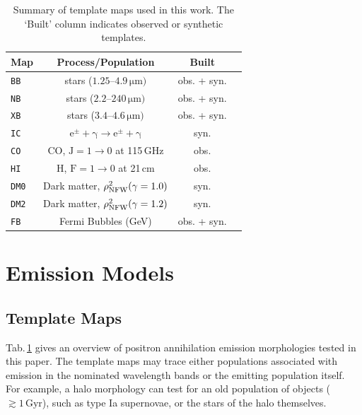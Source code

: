 \documentclass[doublespace,draft,nopageskip]{VTthesis} %
\begin{document}
	
	\begin{table}
		\centering
		\caption{Summary of template maps used in this work. The `Built' column indicates observed or synthetic templates.}
		\begin{tabular}{lccc}
			\hline
			\hline
			Map & Process/Population                                  & Built               \\
			\hline
			\texttt{BB}  & stars ($1.25$--$4.9\,\mathrm{\mu m})$     & obs. + syn.        \\
			\texttt{NB}  & stars  ($2.2$--$240\,\mathrm{\mu m})$     & obs. + syn. \\
			\texttt{XB}  & stars ($3.4$--$4.6\,\mathrm{\mu m})$     & obs. + syn. \\ 
			\texttt{IC}  & $\mathrm{e^{\pm}+\gamma \rightarrow e^{\pm}+\gamma}$ & syn.        \\
			\texttt{CO}  & CO, $\mathrm{J=1 \rightarrow 0}$ at 115\,GHz            & obs.        \\
			\texttt{HI}  & H, $\mathrm{F=1 \rightarrow 0}$ at 21\,cm               & obs.        \\
			\texttt{DM0} & Dark matter, $\rho_{\rm NFW}^2(\gamma=1.0)$             & syn.        \\
			\texttt{DM2} & Dark matter, $\rho_{\rm NFW}^2(\gamma=1.2)$             & syn.        \\
			\texttt{FB}  & Fermi Bubbles (GeV)                                 & obs. + syn. \\
			\hline
			\hline
		\end{tabular}
		\label{tab:maps}
	\end{table}
	
	
	\section{Emission Models}\label{sec:emission_models}
	\subsection{Template Maps}\label{sec:3D_models}
	Tab.\,\ref{tab:maps} gives an overview of positron annihilation emission morphologies tested in this paper.
	The template maps may trace either populations associated with emission in the nominated wavelength bands or the emitting population itself.
	For example, a halo morphology can test for an old population of objects ($\gtrsim 1\,\mathrm{Gyr}$), such as type Ia supernovae, or the stars of the halo themselves.
	
\end{document}
